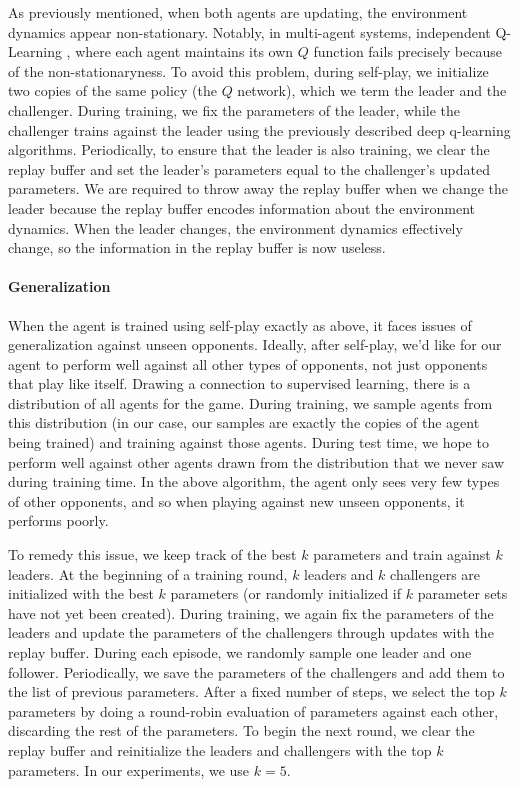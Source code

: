 \documentclass[10pt,twocolumn,letterpaper]{article}
\begin{document}
As previously mentioned, when both agents are updating, the environment
dynamics appear non-stationary. Notably, in multi-agent systems, independent
Q-Learning \citep{tan1993multi}, where each agent maintains its own $Q$
function fails precisely because of the non-stationaryness. To avoid this
problem, during self-play, we initialize two copies of the same policy (the
$Q$ network), which we term the leader and the challenger. During training, we
fix the parameters of the leader, while the challenger trains against the
leader using the previously described deep q-learning algorithms.
Periodically, to ensure that the leader is also training, we clear the replay
buffer and set the leader's parameters equal to the challenger's updated
parameters. We are required to throw away the replay buffer when we change the
leader because the replay buffer encodes information about the environment
dynamics. When the leader changes, the environment dynamics effectively
change, so the information in the replay buffer is now useless.

\paragraph{Generalization}

When the agent is trained using self-play exactly as above, it faces issues of
generalization against unseen opponents. Ideally, after self-play, we'd like
for our agent to perform well against all other types of opponents, not just
opponents that play like itself. Drawing a connection to supervised learning,
there is a distribution of all agents for the game. During training, we sample
agents from this distribution (in our case, our samples are exactly the copies
of the agent being trained) and training against those agents. During test
time, we hope to perform well against other agents drawn from the distribution
that we never saw during training time. In the above algorithm, the agent only
sees very few types of other opponents, and so when playing against new unseen
opponents, it performs poorly.

To remedy this issue, we keep track of the best $k$ parameters and train
against $k$ leaders. At the beginning of a training round, $k$ leaders and $k$
challengers are initialized with the best $k$ parameters (or randomly
initialized if $k$ parameter sets have not yet been created). During training,
we again fix the parameters of the leaders and update the parameters of the
challengers through updates with the replay buffer. During each episode, we
randomly sample one leader and one follower. Periodically, we save the
parameters of the challengers and add them to the list of previous parameters.
After a fixed number of steps, we select the top $k$ parameters by doing a
round-robin evaluation of parameters against each other, discarding the rest
of the parameters. To begin the next round, we clear the replay buffer and
reinitialize the leaders and challengers with the top $k$ parameters. In our
experiments, we use $k = 5$.
\end{document}
